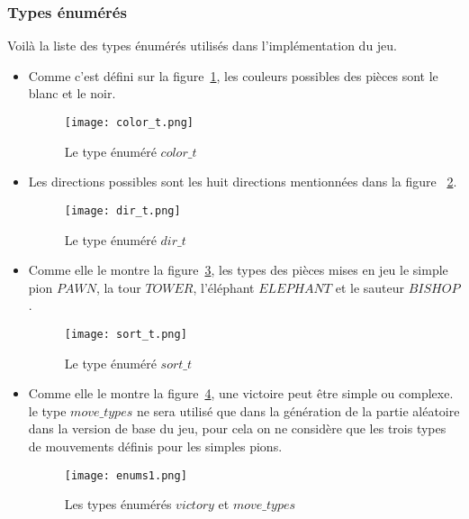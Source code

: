 \documentclass[11pt]{article}
\begin{document}
            \subsubsection{Types énumérés } %
                Voilà la liste des types énumérés utilisés dans l'implémentation du jeu.
                \begin{itemize}
                    \item[] Comme c'est défini sur la figure~\ref{figure9}, les couleurs possibles des pièces sont le blanc et le noir. 
                        \begin{figure}[h]
                        \centering
                        \texttt{[image: color\_t.png]}
                        \caption{Le type énuméré $color\_t$ }
                        \label{figure9}
                        \end{figure}
                    
                    \item[] Les directions possibles sont les huit directions mentionnées dans la figure ~\ref{figure11}.
                        \begin{figure}[h]
                        \centering
                        \texttt{[image: dir\_t.png]}
                        \caption{ Le type énuméré $dir\_t$ }
                        \label{figure11}
                        \end{figure}
                    \item[] Comme elle le montre la figure~\ref{figure10}, les types des pièces mises en jeu le simple pion $PAWN$, la tour $TOWER$, l'éléphant $ELEPHANT$ et le sauteur $BISHOP$.
                        \begin{figure}[h]
                        \centering
                        \texttt{[image: sort\_t.png]}
                        \caption{ Le type énuméré $sort\_t$ }
                        \label{figure10}
                        \end{figure}
                        \newpage
                    \item[] Comme elle le montre la figure~\ref{figure12}, une victoire peut être simple ou complexe. le type $move\_types$ ne sera utilisé que dans la génération de la partie aléatoire dans la version de base du jeu, pour cela on ne considère que les trois types de mouvements définis pour les simples pions.
                        \begin{figure}[h]
                        \centering
                        \texttt{[image: enums1.png]}
                        \caption{ Les types énumérés $victory$ et $move\_types$ }
                        \label{figure12}
                        \end{figure}
                \end{itemize}
\end{document}
